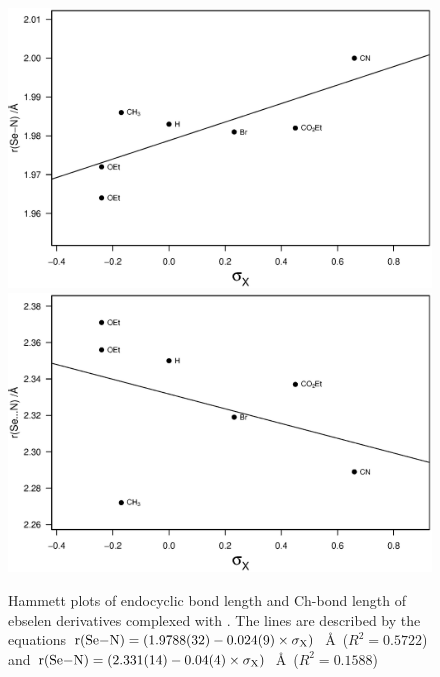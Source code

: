 \begin{refsection}
\begin{figure}
  \centering
  \includegraphics[width=0.9\linewidth]{Figures/hammett-endo-pyrrol.eps}
  \includegraphics[width=0.9\linewidth]{Figures/hammett-pyrrol.eps}
  \caption[Hammett plots of endocyclic  bond length and  Ch-bond length of ebselen derivatives complexed with .]{Hammett plots of endocyclic  bond length and  Ch-bond length of ebselen derivatives complexed with . The lines are described by the equations $\mathrm{r}(\ce{Se-N}) = (1.9788(32) - 0.024(9) \times \sigma_{\mathrm{X}})$~\AA~($R^2=0.5722$) and $\mathrm{r}(\ce{Se-N}) = (2.331(14) - 0.04(4) \times \sigma_{\mathrm{X}})$~\AA~($R^2=0.1588$)}
  \label{fig:hammett-pyrrol}
\end{figure}


\end{refsection}
